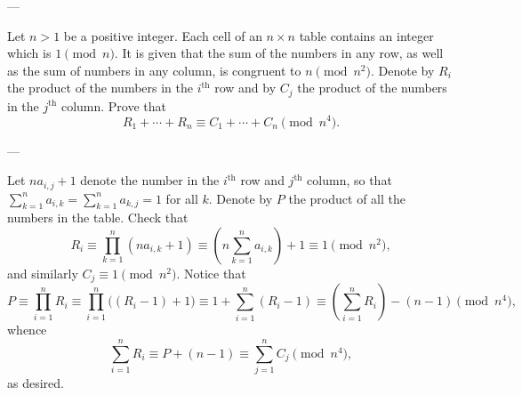 
---

Let $n>1$ be a positive integer. Each cell of an $n\times n$ table contains an integer which is $1\pmod n$. It is given that the sum of the numbers in any row, as well as the sum of numbers in any column, is congruent to $n\pmod{n^2}$. Denote by $R_i$ the product of the numbers in the $i^\text{th}$ row and by $C_j$ the product of the numbers in the $j^\text{th}$ column. Prove that \[R_1+\cdots+R_n\equiv C_1+\cdots+C_n\pmod{n^4}.\]

---

Let $na_{i,j}+1$ denote the number in the $i^\text{th}$ row and $j^\text{th}$ column, so that $\sum_{k=1}^na_{i,k}=\sum_{k=1}^na_{k,j}=1$ for all $k$. Denote by $P$ the product of all the numbers in the table. Check that \[R_i\equiv\prod_{k=1}^n(na_{i,k}+1)\equiv\left(n\sum_{k=1}^na_{i,k}\right)+1\equiv1\pmod{n^2},\]
and similarly $C_j\equiv1\pmod{n^2}$. Notice that \[P\equiv\prod_{i=1}^nR_i\equiv\prod_{i=1}^n\Big((R_i-1)+1\Big)\equiv1+\sum_{i=1}^n(R_i-1)\equiv\left(\sum_{i=1}^n R_i\right)-(n-1)\pmod{n^4},\]
whence \[\sum_{i=1}^n R_i\equiv P+(n-1)\equiv\sum_{j=1}^n C_j\pmod{n^4},\]
as desired.
